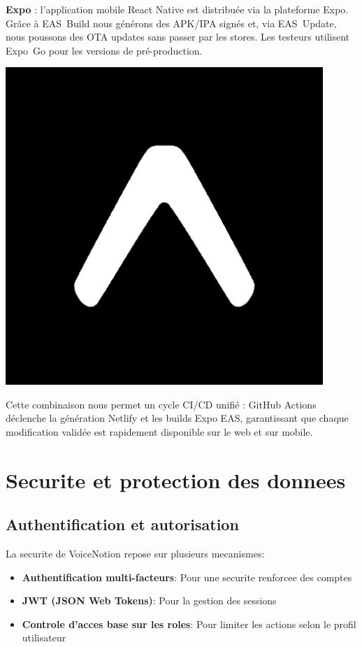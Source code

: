 \begin{minipage}{0.7\textwidth}
\textbf{Expo} : l’application mobile React Native est distribuée via la plateforme Expo. Grâce à EAS~Build nous générons des APK/IPA signés et, via EAS~Update, nous poussons des OTA updates sans passer par les stores. Les testeurs utilisent Expo~Go pour les versions de pré-production.
\end{minipage}%
\hfill
\begin{minipage}{0.25\textwidth}
\centering
\includegraphics[width=0.9\textwidth]{assets/docs/logo_expo.png}
\end{minipage}

Cette combinaison nous permet un cycle CI/CD unifié : GitHub Actions déclenche la génération Netlify et les builds Expo EAS, garantissant que chaque modification validée est rapidement disponible sur le web et sur mobile.

\section{Securite et protection des donnees}
\subsection{Authentification et autorisation}
La securite de VoiceNotion repose sur plusieurs mecanismes:
\begin{itemize}
    \item \textbf{Authentification multi-facteurs}: Pour une securite renforcee des comptes
    \item \textbf{JWT (JSON Web Tokens)}: Pour la gestion des sessions
    \item \textbf{Controle d'acces base sur les roles}: Pour limiter les actions selon le profil utilisateur
\end{itemize}

